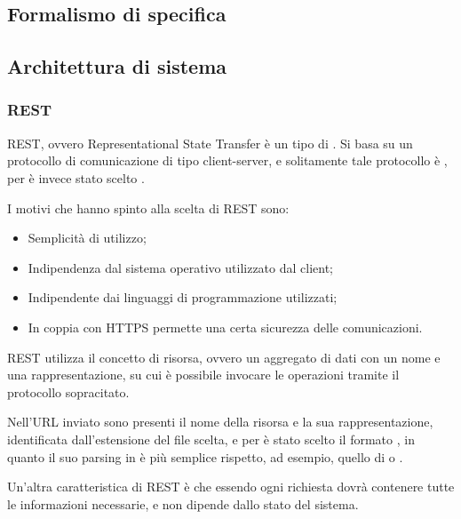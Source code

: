 \subsection{Formalismo di specifica}
\subsection{Architettura di sistema}
\subsubsection{REST}
REST, ovvero Representational State Transfer è un tipo di . Si basa su un protocollo di comunicazione  di tipo client-server, e solitamente tale protocollo è , per \ProjectName è invece stato scelto .

I motivi che hanno spinto alla scelta di REST sono:
\begin{itemize}
\item Semplicità di utilizzo;
\item Indipendenza dal sistema operativo utilizzato dal client;
\item Indipendente dai linguaggi di programmazione utilizzati;
\item In coppia con HTTPS permette una certa sicurezza delle comunicazioni.
\end{itemize}

REST utilizza il concetto di risorsa, ovvero un aggregato di dati con un nome e una rappresentazione, su cui è possibile invocare le operazioni  tramite il protocollo sopracitato.

Nell'URL inviato sono presenti il nome della risorsa e la sua rappresentazione, identificata dall'estensione del file scelta, e per \ProjectName è stato scelto il formato , in quanto il suo parsing in  è più semplice rispetto, ad esempio, quello di  o .

Un'altra caratteristica di REST è che essendo  ogni richiesta dovrà contenere tutte le informazioni necessarie, e non dipende dallo stato del sistema.
